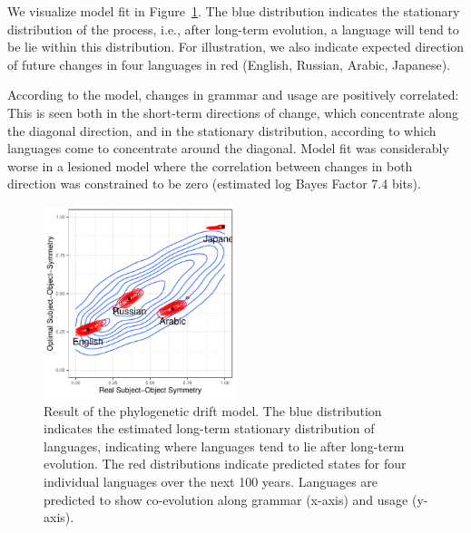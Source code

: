 \documentclass[11pt,a4paper]{article}
\begin{document}





We visualize model fit in Figure~\ref{fig:drift-model}.
The blue distribution indicates the stationary distribution of the process, i.e., after long-term evolution, a language will tend to be lie within this distribution.
For illustration, we also indicate expected direction of future changes in four languages in red (English, Russian, Arabic, Japanese).

According to the model, changes in grammar and usage are positively correlated:
This is seen both in the short-term directions of change, which concentrate along the diagonal direction, and in the stationary distribution, according to which languages come to concentrate around the diagonal.
Model fit was considerably worse in a lesioned model where the correlation between changes in both direction was constrained to be zero (estimated log Bayes Factor 7.4 bits).


\begin{figure}
    \centering
    \includegraphics[width=0.5\textwidth]{change/visualize/stationary.pdf}
    \caption{Result of the phylogenetic drift model.
    The blue distribution indicates the estimated long-term stationary distribution of languages, indicating where languages tend to lie after long-term evolution.
    The red distributions indicate predicted states for four individual languages over the next 100 years. Languages are predicted to show co-evolution along grammar (x-axis)  and usage (y-axis).}
    \label{fig:drift-model}
\end{figure}
\end{document}
